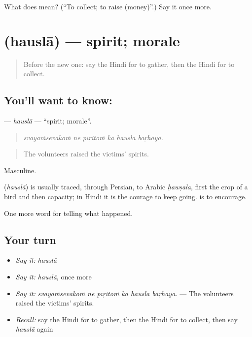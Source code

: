 \begin{tcolorbox}[breakable,colback=teal!4,colframe=teal!35!black,title={Before you move on}]
What does  mean? (\textquotedblleft{}To collect; to raise (money)\textquotedblright{}.) Say it once more.
\end{tcolorbox}
\section[\texorpdfstring{\hi{हौसला} (hauslā)}{हौसला (hauslā)}]{ (hauslā) — spirit; morale}

\label{lesson:HI-C311-hausla}



\begin{quote}
Before the new one: say the Hindi for to gather, then the Hindi for to collect.
\end{quote}

\subsection*{You'll want to know: }
\textbf{} — \emph{hauslā} — \textquotedblleft{}spirit; morale\textquotedblright{}.

\begin{quote}
     
\end{quote}

\begin{quote}
\emph{svayaṁsevakoṁ ne pīṛitoṁ kā hauslā baṛhāyā.}
\end{quote}

\begin{quote}
The volunteers raised the victims' spirits.
\end{quote}

Masculine.

\begin{cousinweb}
\textbf{} (\emph{hauslā}) is usually traced, through Persian, to Arabic \emph{ḥawṣala}, first the crop of a bird and then capacity; in Hindi it is the courage to keep going. \textbf{ } is to encourage.
\end{cousinweb}

\begin{grammarlens}[title={What you've built}]
One more word for telling what happened.
\end{grammarlens}

\subsection*{Your turn}
\begin{itemize}
\raggedright
  \item \emph{Say it:} \emph{hauslā}
  \item \emph{Say it:} \emph{hauslā}, once more
  \item \emph{Say it:} \emph{svayaṁsevakoṁ ne pīṛitoṁ kā hauslā baṛhāyā.} — The volunteers raised the victims' spirits.
  \item \emph{Recall:} say the Hindi for to gather, then the Hindi for to collect, then say \emph{hauslā} again
\end{itemize}

